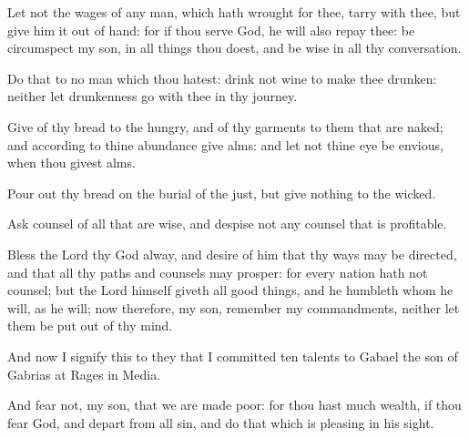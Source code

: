 {\par }{\PP {}Let not the wages of any man, which hath wrought for thee, tarry with thee, but give him it out of hand: for if thou serve God, he will also repay thee: be circumspect my son, in all things thou doest, and be wise in all thy conversation.
\par }{\PP {}Do that to no man which thou hatest: drink not wine to make thee drunken: neither let drunkenness go with thee in thy journey.
\par }{\PP {}Give of thy bread to the hungry, and of thy garments to them that are naked; and according to thine abundance give alms: and let not thine eye be envious, when thou givest alms.
\par }{\PP {}Pour out thy bread on the burial of the just, but give nothing to the wicked.
\par }{\PP {}Ask counsel of all that are wise, and despise not any counsel that is profitable.
\par }{\PP {}Bless the Lord thy God alway, and desire of him that thy ways may be directed, and that all thy paths and counsels may prosper: for every nation hath not counsel; but the Lord himself giveth all good things, and he humbleth whom he will, as he will; now therefore, my son, remember my commandments, neither let them be put out of thy mind.
\par }{\PP {}And now I signify this to they that I committed ten talents to Gabael the son of Gabrias at Rages in Media.
\par }{\PP {}And fear not, my son, that we are made poor: for thou hast much wealth, if thou fear God, and depart from all sin, and do that which is pleasing in his sight.

}

